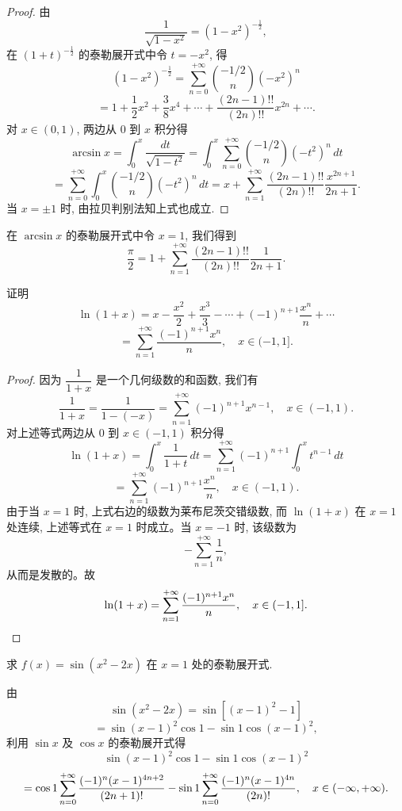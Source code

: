 \begin{proof}
由
\[
  \frac1{\sqrt{1-x^2}}=(1-x^2)^{-\frac12},
\]
在 $(1+t)^{-\frac12}$ 的泰勒展开式中令 $t=-x^2$, 得
\[
  (1-x^2)^{-\frac12}
  =
  \sum_{n=0}^{+\infty}\binom{-1/2}{n}(-x^2)^n
\]
\[
  =
  1+\frac12x^2+\frac38x^4+\cdots
  +\frac{(2n-1)!!}{(2n)!!}x^{2n}+\cdots .
\]
对 $x\in(0,1)$, 两边从 $0$ 到 $x$ 积分得
\[
  \arcsin x
  =
  \int_0^x\frac{dt}{\sqrt{1-t^2}}
  =
  \int_0^x
  \sum_{n=0}^{+\infty}\binom{-1/2}{n}(-t^2)^n\,dt
\]
\[
  =
  \sum_{n=0}^{+\infty}
  \int_0^x\binom{-1/2}{n}(-t^2)^n\,dt
  =
  x+\sum_{n=1}^{+\infty}
  \frac{(2n-1)!!}{(2n)!!}\frac{x^{2n+1}}{2n+1}.
\]
当 $x=\pm1$ 时, 由拉贝判别法知上式也成立.
\end{proof}


\begin{remark}\label{remark:ma-11-source-47}
在 $\arcsin x$ 的泰勒展开式中令 $x=1$, 我们得到
\[
  \frac{\pi}{2}
  =
  1+\sum_{n=1}^{+\infty}
  \frac{(2n-1)!!}{(2n)!!}\frac1{2n+1}.
\]
\end{remark}


\begin{example}\label{example:ma-11-3-6}
证明
\[
  \ln(1+x)
  =
  x-\frac{x^2}{2}+\frac{x^3}{3}-\cdots
  +(-1)^{n+1}\frac{x^n}{n}+\cdots
\]
\[
  =
  \sum_{n=1}^{+\infty}\frac{(-1)^{n+1}x^n}{n},
  \quad x\in(-1,1].
\]
\end{example}


\begin{proof}
因为 $\dfrac1{1+x}$ 是一个几何级数的和函数, 我们有
\[
  \frac1{1+x}
  =
  \frac1{1-(-x)}
  =
  \sum_{n=1}^{+\infty}(-1)^{n+1}x^{n-1},
  \quad x\in(-1,1).
\]
对上述等式两边从 $0$ 到 $x\in(-1,1)$ 积分得
\[
  \ln(1+x)
  =
  \int_0^x\frac1{1+t}\,dt
  =
  \sum_{n=1}^{+\infty}(-1)^{n+1}\int_0^x t^{n-1}\,dt
\]
\[
  =
  \sum_{n=1}^{+\infty}(-1)^{n+1}\frac{x^n}{n},
  \quad x\in(-1,1).
\]
由于当 $x=1$ 时, 上式右边的级数为莱布尼茨交错级数, 而 $\ln(1+x)$ 在 $x=1$ 处连续, 上述等式在 $x=1$ 时成立。当 $x=-1$ 时, 该级数为
\[
  -\sum_{n=1}^{+\infty}\frac1n,
\]
从而是发散的。故
\[
  \ln(1+x)
  =
  \sum_{n=1}^{+\infty}\frac{(-1)^{n+1}x^n}{n},
  \quad x\in(-1,1].
\qedhere
\]
\end{proof}


\begin{example}\label{example:ma-11-3-7}
求 $f(x)=\sin(x^2-2x)$ 在 $x=1$ 处的泰勒展开式.
\end{example}


\begin{solve}
由
\[
  \sin(x^2-2x)
  =
  \sin[(x-1)^2-1]
\]
\[
  =
  \sin(x-1)^2\cos1-\sin1\cos(x-1)^2,
\]
利用 $\sin x$ 及 $\cos x$ 的泰勒展开式得
\[
  \sin(x-1)^2\cos1-\sin1\cos(x-1)^2
\]
\[
  =
  \cos1\sum_{n=0}^{+\infty}
  \frac{(-1)^n(x-1)^{4n+2}}{(2n+1)!}
  -
  \sin1\sum_{n=0}^{+\infty}
  \frac{(-1)^n(x-1)^{4n}}{(2n)!},
  \quad x\in(-\infty,+\infty).
\qedhere
\]
\end{solve}


